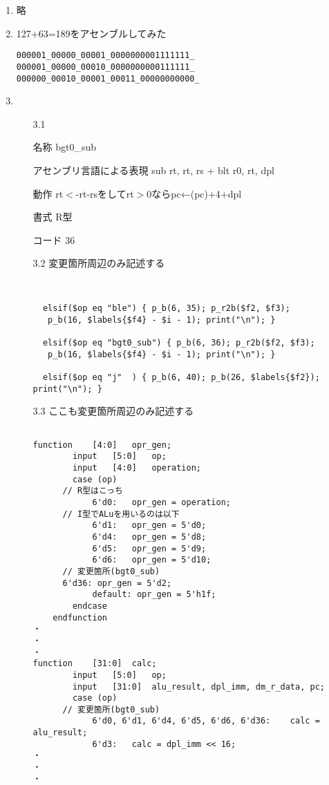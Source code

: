 \documentclass[dvipdfmx]{jsarticle}
\begin{document}
\begin{enumerate}

\item

略




\item

127+63=189をアセンブルしてみた
\begin{verbatim}
000001_00000_00001_0000000001111111_
000001_00000_00010_0000000000111111_
000000_00010_00001_00011_00000000000_
\end{verbatim}

\item


\begin{enumerate}


\item[3.1]

名称 bgt0\_sub

アセンブリ言語による表現 sub rt, rt, rs + blt r0, rt, dpl

動作 rt$<$-rt-rsをしてrt$>$0ならpc←(pc)+4+dpl

書式 R型

コード 36

\item[3.2]
変更箇所周辺のみ記述する
\begin{verbatim}


  elsif($op eq "ble") { p_b(6, 35); p_r2b($f2, $f3);
   p_b(16, $labels{$f4} - $i - 1); print("\n"); }
 
  elsif($op eq "bgt0_sub") { p_b(6, 36); p_r2b($f2, $f3);
   p_b(16, $labels{$f4} - $i - 1); print("\n"); }
  
  elsif($op eq "j"  ) { p_b(6, 40); p_b(26, $labels{$f2}); print("\n"); }

\end{verbatim}

\item[3.3]
ここも変更箇所周辺のみ記述する
\begin{verbatim}

function	[4:0]	opr_gen;
		input	[5:0]	op;
		input	[4:0]	operation;
		case (op)
      // R型はこっち
			6'd0:	opr_gen = operation;
      // I型でALuを用いるのは以下
			6'd1:	opr_gen = 5'd0;
			6'd4:	opr_gen = 5'd8;
			6'd5:	opr_gen = 5'd9;
			6'd6:	opr_gen = 5'd10;
      // 変更箇所(bgt0_sub)
      6'd36: opr_gen = 5'd2;
			default: opr_gen = 5'h1f;
		endcase
	endfunction
・
・
・
function	[31:0]	calc;
		input	[5:0]	op;
		input	[31:0]	alu_result, dpl_imm, dm_r_data, pc;
		case (op)
      // 変更箇所(bgt0_sub)
			6'd0, 6'd1, 6'd4, 6'd5, 6'd6, 6'd36:	calc = alu_result;
			6'd3:	calc = dpl_imm << 16;
・
・
・


\end{verbatim}
\end{enumerate}
\end{enumerate}
\end{document}
